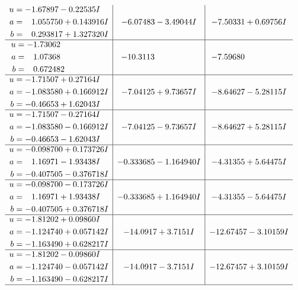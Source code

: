 \documentclass[1p]{elsarticle_modified}
\theoremstyle{definition}
\begin{document}
$$\begin{array}{c|c|c}
\begin{aligned}
u &= -1.67897 - 0.22535 I \\
a &= \phantom{-}1.055750 + 0.143916 I \\
b &= \phantom{-}0.293817 + 1.327320 I\end{aligned}
 & -6.07483 - 3.49044 I & -7.50331 + 0.69756 I \\ \hline\begin{aligned}
u &= -1.73062\phantom{ +0.000000I} \\
a &= \phantom{-}1.07368\phantom{ +0.000000I} \\
b &= \phantom{-}0.672482\phantom{ +0.000000I}\end{aligned}
 & -10.3113\phantom{ +0.000000I} & -7.59680\phantom{ +0.000000I} \\ \hline\begin{aligned}
u &= -1.71507 + 0.27164 I \\
a &= -1.083580 + 0.166912 I \\
b &= -0.46653 + 1.62043 I\end{aligned}
 & -7.04125 + 9.73657 I & -8.64627 - 5.28115 I \\ \hline\begin{aligned}
u &= -1.71507 - 0.27164 I \\
a &= -1.083580 - 0.166912 I \\
b &= -0.46653 - 1.62043 I\end{aligned}
 & -7.04125 - 9.73657 I & -8.64627 + 5.28115 I \\ \hline\begin{aligned}
u &= -0.098700 + 0.173726 I \\
a &= \phantom{-}1.16971 - 1.93438 I \\
b &= -0.407505 - 0.376718 I\end{aligned}
 & -0.333685 - 1.164940 I & -4.31355 + 5.64475 I \\ \hline\begin{aligned}
u &= -0.098700 - 0.173726 I \\
a &= \phantom{-}1.16971 + 1.93438 I \\
b &= -0.407505 + 0.376718 I\end{aligned}
 & -0.333685 + 1.164940 I & -4.31355 - 5.64475 I \\ \hline\begin{aligned}
u &= -1.81202 + 0.09860 I \\
a &= -1.124740 + 0.057142 I \\
b &= -1.163490 + 0.628217 I\end{aligned}
 & -14.0917 + 3.7151 I & -12.67457 - 3.10159 I \\ \hline\begin{aligned}
u &= -1.81202 - 0.09860 I \\
a &= -1.124740 - 0.057142 I \\
b &= -1.163490 - 0.628217 I\end{aligned}
 & -14.0917 - 3.7151 I & -12.67457 + 3.10159 I\\
 \hline 
 \end{array}$$\newpage\newpage\renewcommand{\arraystretch}{1}
\end{document}

